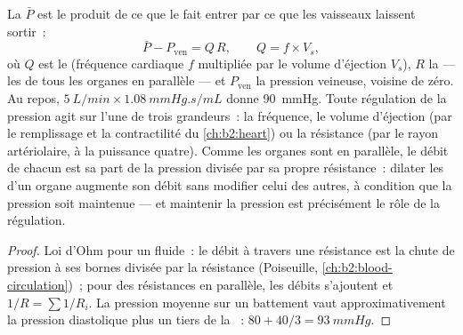 \begin{theorem}\label{thm:b2:blood-pressure:equation}
La  $\bar P$ est le produit de ce que le 
fait entrer par ce que les vaisseaux laissent sortir~:
\[
\bar P - P_{\text{ven}} = Q\,R, \qquad Q = f\times V_s,
\]
où $Q$ est le  (fréquence cardiaque $f$ multipliée par le
volume d'éjection
$V_s$), $R$ la  --- les  de tous
les organes en parallèle --- et $P_{\text{ven}}$ la pression veineuse,
voisine de zéro. Au repos, $\qty{5}{L/min}\times\qty{1.08}{mmHg.s/mL}$
donne \qty{90}{mmHg}. Toute régulation de la pression agit sur l'une de
trois grandeurs~: la fréquence, le volume d'éjection (par le remplissage
et la contractilité du \cref{ch:b2:heart}) ou la résistance (par le
rayon artériolaire, à la puissance quatre). Comme les organes sont en
parallèle, le débit de chacun est sa part de la pression divisée par sa
propre résistance~: dilater les  d'un organe augmente son
débit sans modifier celui des autres, à condition que la pression soit
maintenue --- et maintenir la pression est précisément le rôle de la
régulation.
\end{theorem}
\begin{proof}
Loi d'Ohm pour un fluide~: le débit à travers une résistance est la
chute de pression à ses bornes divisée par la résistance (Poiseuille,
\cref{ch:b2:blood-circulation})~; pour des résistances en parallèle, les
débits s'ajoutent et $1/R = \sum 1/R_i$. La pression moyenne sur un
battement vaut approximativement la pression diastolique plus un tiers
de la ~:
$80 + 40/3 = \qty{93}{mmHg}$.
\end{proof}

